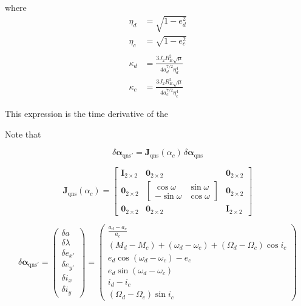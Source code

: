 where
\begin{align*}
\eta_d &= \sqrt{1 - e_d^2} \\
\eta_c &= \sqrt{1 - e_c^2} \\
\\
\kappa_d &= \frac{3 J_2 R_E^2 \sqrt{\mu}}{4 a_d^{7/2} \eta_d^4} \\
\kappa_c &= \frac{3 J_2 R_E^2 \sqrt{\mu}}{4 a_c^{7/2} \eta_c^4}
\end{align*}

This expression is the time derivative of the 


Note that

\begin{equation}
\delta \boldsymbol{\alpha}_{\text{qns}'} = \mathbf{J}_{\text{qns}}(\alpha_c) \, \delta \boldsymbol{\alpha}_{\text{qns}}
\end{equation}

\begin{equation}
\mathbf{J}_{\text{qns}}(\alpha_c) =
\begin{bmatrix}
\mathbf{I}_{2 \times 2} & \mathbf{0}_{2 \times 2} & \mathbf{0}_{2 \times 2} \\
\mathbf{0}_{2 \times 2} & 
\begin{bmatrix}
\cos \omega & \sin \omega \\
-\sin \omega & \cos \omega
\end{bmatrix}
& \mathbf{0}_{2 \times 2} \\
\mathbf{0}_{2 \times 2} & \mathbf{0}_{2 \times 2} & \mathbf{I}_{2 \times 2}
\end{bmatrix}
\end{equation}

\begin{equation}
\delta \boldsymbol{\alpha}_{\text{qns}'} =
\begin{pmatrix}
\delta a \\
\delta \lambda \\
\delta e_{x'} \\
\delta e_{y'} \\
\delta i_x \\
\delta i_y
\end{pmatrix}
=
\begin{pmatrix}
\frac{a_d - a_c}{a_c} \\
(M_d - M_c) + (\omega_d - \omega_c) + (\Omega_d - \Omega_c) \cos i_c \\
e_d \cos(\omega_d - \omega_c) - e_c \\
e_d \sin(\omega_d - \omega_c) \\
i_d - i_c \\
(\Omega_d - \Omega_c) \sin i_c
\end{pmatrix}
\end{equation}

